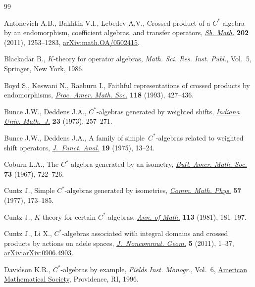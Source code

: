 \documentclass[pdftex]{sigma}
\numberwithin{equation}{section}
\begin{document}
\begin{thebibliography}{99}
\footnotesize\itemsep=0pt

Antonevich A.B., Bakhtin V.I., Lebedev A.V., Crossed product of a
 {$C^*$}-algebra by an endomorphism, coefficient algebras, and transfer
 operators, \href{https://doi.org/10.1070/SM2011v202n09ABEH004186}{\textit{Sb.
 Math.}} \textbf{202} (2011), 1253--1283,
 \href{http://arxiv.org/abs/math.OA/0502415}{arXiv:math.OA/0502415}.

Blackadar B., {$K$}-theory for operator algebras, \textit{Math. Sci. Res. Inst.
 Publ.}, Vol.~5, \href{https://doi.org/10.1007/978-1-4613-9572-0}{Springer},
 New York, 1986.

Boyd S., Keswani N., Raeburn I., Faithful representations of crossed products
 by endomorphisms, \href{https://doi.org/10.2307/2160319}{\textit{Proc. Amer.
 Math. Soc.}} \textbf{118} (1993), 427--436.

Bunce J.W., Deddens J.A., {$C^{\ast} $}-algebras generated by weighted shifts,
 \href{https://doi.org/10.1512/iumj.1973.23.23022}{\textit{Indiana Univ.
 Math.~J.}} \textbf{23} (1973), 257--271.

Bunce J.W., Deddens J.A., A family of simple~{$C^{\ast} $}-algebras related to
 weighted shift operators,
 \href{https://doi.org/10.1016/0022-1236(75)90003-8}{\textit{J.~Funct. Anal.}}
 \textbf{19} (1975), 13--24.

Coburn L.A., The {$C^{\ast} $}-algebra generated by an isometry,
 \href{https://doi.org/10.1090/S0002-9904-1967-11845-7}{\textit{Bull. Amer.
 Math. Soc.}} \textbf{73} (1967), 722--726.

Cuntz J., Simple {$C^*$}-algebras generated by isometries,
 \href{https://doi.org/10.1007/BF01625776}{\textit{Comm. Math. Phys.}}
 \textbf{57} (1977), 173--185.

Cuntz J., {$K$}-theory for certain {$C^{\ast} $}-algebras,
 \href{https://doi.org/10.2307/1971137}{\textit{Ann. of Math.}} \textbf{113}
 (1981), 181--197.

Cuntz J., Li X., {$C^\ast$}-algebras associated with integral domains and
 crossed products by actions on adele spaces,
 \href{https://doi.org/10.4171/JNCG/68}{\textit{J.~Noncommut. Geom.}}
 \textbf{5} (2011), 1--37,
 \href{http://arxiv.org/abs/arXiv:0906.4903}{arXiv:arXiv:0906.4903}.

Davidson K.R., {$C^*$}-algebras by example, \textit{Fields Inst. Monogr.},
 Vol.~6, \href{https://doi.org/10.1090/fim/006}{American Mathematical Society},
 Providence, RI, 1996.


\end{thebibliography}
\end{document}
